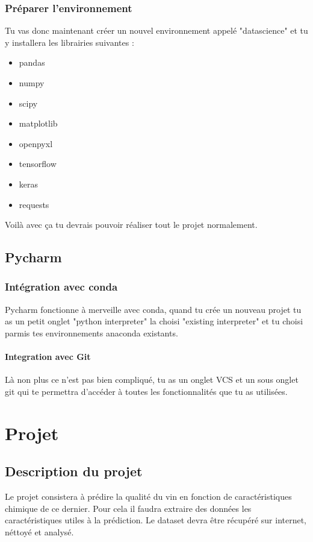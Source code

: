 \documentclass[10pt,a4paper]{book}
\begin{document}
\subsection{Préparer l'environnement}
Tu vas donc maintenant créer un nouvel environnement appelé "datascience" et tu y installera les librairies suivantes :
 
\begin{itemize}

\item pandas
\item numpy
\item scipy
\item matplotlib
\item openpyxl
\item tensorflow
\item keras
\item requests
\end{itemize}

Voilà avec ça tu devrais pouvoir réaliser tout le projet normalement.

\section{Pycharm}
\subsection{Intégration avec conda}
Pycharm fonctionne à merveille avec  conda, quand tu crée un nouveau projet tu as un petit onglet "python interpreter" la choisi "existing interpreter" et tu choisi parmis tes environnements anaconda existants.

\subsubsection{Integration avec Git}
Là non plus ce n'est pas bien compliqué, tu as un onglet VCS et un sous onglet git qui te permettra d'accéder à toutes les fonctionnalités que tu as utilisées.

\chapter{Projet}

\section{Description du projet}

Le projet consistera à prédire la qualité du vin en fonction de caractéristiques chimique de ce dernier. Pour cela il faudra extraire des données les caractéristiques utiles à la prédiction.
Le dataset devra être récupéré sur internet, néttoyé et analysé.
\end{document}
